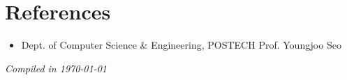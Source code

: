 \documentclass[11pt,a4paper,sans]{moderncv}
\newcommand{\changeurlcolor}[1]{\hypersetup{urlcolor=#1}}
\begin{document}
\section{References}
\vspace{2mm}

\begin{itemize}

    \item{
                  {Dept. of Computer Science \& Engineering, POSTECH}
                  {\changeurlcolor{refColor}Prof. Youngjoo Seo \hspace{0.2mm} \href{mailto:yjsuh@postech.ac.kr}{\faEnvelope}}{}{}{}}
\vspace{4mm} 
\end{itemize}

\begin{center}
    \textit{Compiled in \today}
\end{center}
\end{document}
